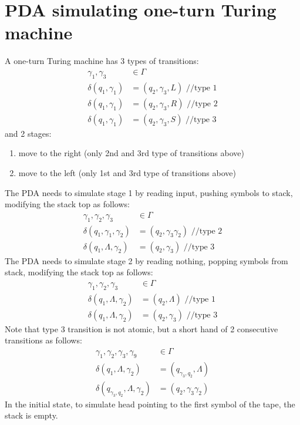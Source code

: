 \documentclass{article}
\begin{document}
\section{PDA simulating one-turn Turing machine}
 A one-turn Turing machine has 3 types of transitions:
\begin{align*}
\gamma_1, \gamma_3 &\in \Gamma\\
\delta(q_1, \gamma_1) &= (q_2, \gamma_3, L) \text{ //type 1}\\
\delta(q_1, \gamma_1) &= (q_2, \gamma_3, R) \text{ //type 2}\\
\delta(q_1, \gamma_1) &= (q_2, \gamma_3, S) \text{ //type 3}
\end{align*}
and 2 stages:
\begin{enumerate}
  \item move to the right (only 2nd and 3rd type of transitions above)
  \item move to the left (only 1st and 3rd type of transitions above)
\end{enumerate}
The PDA needs to simulate stage 1 by reading input, pushing symbols to stack,
modifying the stack top as follows:
\begin{align*}
\gamma_1, \gamma_2, \gamma_3 &\in \Gamma\\
\delta(q_1, \gamma_1, \gamma_2) &= (q_2, \gamma_3 \gamma_2) \text{ //type 2}\\
\delta(q_1, \Lambda, \gamma_2) &= (q_2, \gamma_3) \text{ //type 3}
\end{align*}
The PDA needs to simulate stage 2 by reading nothing, popping symbols from
stack, modifying the stack top as follows:
\begin{align*}
\gamma_1, \gamma_2, \gamma_3 &\in \Gamma\\
\delta(q_1, \Lambda, \gamma_2) &= (q_2, \Lambda) \text{ //type 1}\\
\delta(q_1, \Lambda, \gamma_2) &= (q_2, \gamma_3) \text{ //type 3}
\end{align*}
Note that type 3 transition is not atomic, but a short hand of 2 consecutive
transitions as follows:
\begin{align*}
\gamma_1, \gamma_2, \gamma_3, \gamma_9 &\in \Gamma\\
\delta(q_1, \Lambda, \gamma_2) &= (q_{\gamma_3, q_2}, \Lambda)\\
\delta(q_{\gamma_3, q_2}, \Lambda, \gamma_2) &= (q_2, \gamma_3\gamma_2)
\end{align*}
In the initial state, to simulate head pointing to the first symbol of the tape,
the stack is empty.
\end{document}
